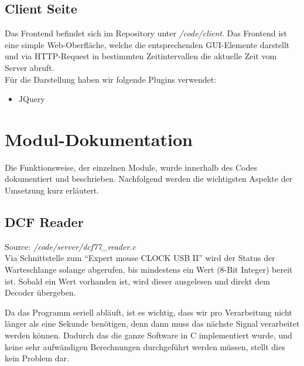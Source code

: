 \subsection{Client Seite}
Das Frontend befindet sich im Repository unter \textit{/code/client}. Das Frontend ist eine simple Web-Oberfläche, welche die entsprechenden GUI-Elemente darstellt und via HTTP-Request in bestimmten Zeitintervallen die aktuelle Zeit vom Server abruft. \\

Für die Darstellung haben wir folgende Plugins verwendet:
\begin{itemize}
\item JQuery
\end{itemize}


\section{Modul-Dokumentation}
Die Funktionsweise, der einzelnen Module, wurde innerhalb des Codes dokumentiert und beschrieben. Nachfolgend werden die wichtigsten Aspekte der Umsetzung kurz erläutert.

\subsection{DCF Reader}
Source: \textit{/code/server/dcf77\_reader.c}\\
Via Schnittstelle zum "`Expert mouse CLOCK USB II"' wird der Status der Warteschlange  solange abgerufen, bis mindestens ein Wert (8-Bit Integer) bereit ist.
Sobald ein Wert vorhanden ist, wird dieser ausgelesen und direkt dem Decoder übergeben.

Da das Programm seriell abläuft, ist es wichtig, dass wir pro Verarbeitung nicht länger als eine Sekunde benötigen, denn dann muss das nächste Signal verarbeitet werden können.
Dadurch das die ganze Software in C implementiert wurde, und keine sehr aufwändigen Berechnungen durchgeführt werden müssen, stellt dies kein Problem dar.


